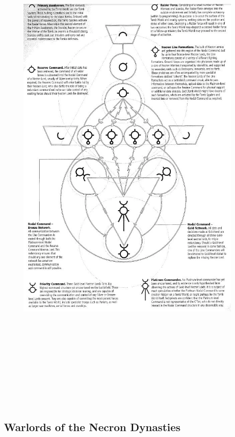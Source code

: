 {\begin{figure}
	\centering
	\includegraphics[width=515pt, height=750pt]{nodal.png}
\end{figure}
}

\newpage
\subsection{Warlords of the Necron Dynasties}

